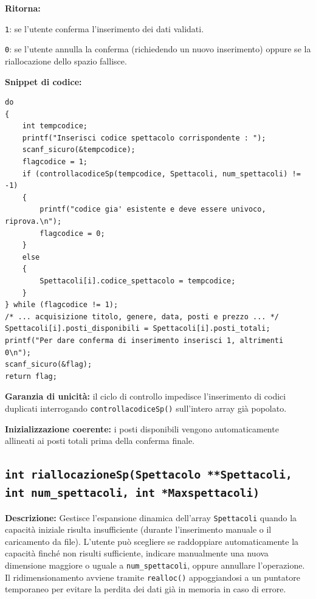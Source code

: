 \documentclass[11pt,a4paper,oneside,openany]{book}
\newenvironment{listacomp}{%
    \small
    \begin{list}{\textendash}{%
        \setlength{\topsep}{2pt}%
        \setlength{\partopsep}{0pt}%
        \setlength{\itemsep}{1pt}%
        \setlength{\parsep}{0pt}%
        \setlength{\leftmargin}{1.2em}%
    }%
}{%
    \end{list}%
}
\begin{document}
\noindent\textbf{Ritorna:}
\begin{listacomp}
    \item \texttt{1}: se l'utente conferma l'inserimento dei dati validati.
    \item \texttt{0}: se l'utente annulla la conferma (richiedendo un nuovo inserimento) oppure se la riallocazione dello spazio fallisce.
\end{listacomp}

\noindent\textbf{Snippet di codice:}
\begin{lstlisting}[caption={Validazione univocità codice e conferma inserimento in inserimentospettacolo()}]
do
{
    int tempcodice;
    printf("Inserisci codice spettacolo corrispondente : ");
    scanf_sicuro(&tempcodice);
    flagcodice = 1;
    if (controllacodiceSp(tempcodice, Spettacoli, num_spettacoli) != -1)
    {
        printf("codice gia' esistente e deve essere univoco, riprova.\n");
        flagcodice = 0;
    }
    else
    {
        Spettacoli[i].codice_spettacolo = tempcodice;
    }
} while (flagcodice != 1);
/* ... acquisizione titolo, genere, data, posti e prezzo ... */
Spettacoli[i].posti_disponibili = Spettacoli[i].posti_totali;
printf("Per dare conferma di inserimento inserisci 1, altrimenti 0\n");
scanf_sicuro(&flag);
return flag;
\end{lstlisting}

\begin{listacomp}
    \item \textbf{Garanzia di unicità:} il ciclo di controllo impedisce l'inserimento di codici duplicati interrogando \texttt{controllacodiceSp()} sull'intero array già popolato.
    \item \textbf{Inizializzazione coerente:} i posti disponibili vengono automaticamente allineati ai posti totali prima della conferma finale.
\end{listacomp}

\subsection[riallocazioneSp()]{\texttt{int riallocazioneSp(Spettacolo **Spettacoli, int num\_spettacoli, int *Maxspettacoli)}}

\noindent\textbf{Descrizione:}
Gestisce l'espansione dinamica dell'array \texttt{Spettacoli} quando la capacità iniziale risulta insufficiente (durante l'inserimento manuale o il caricamento da file). L'utente può scegliere se raddoppiare automaticamente la capacità finché non risulti sufficiente, indicare manualmente una nuova dimensione maggiore o uguale a \texttt{num\_spettacoli}, oppure annullare l'operazione. Il ridimensionamento avviene tramite \texttt{realloc()} appoggiandosi a un puntatore temporaneo per evitare la perdita dei dati già in memoria in caso di errore.
\end{document}
